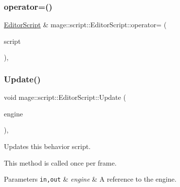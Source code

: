 \mbox{\label{classmage_1_1script_1_1_editor_script_a87df2b20fee97f6aa9e09b4b5c9282a5}} 
\subsubsection{\texorpdfstring{operator=()}{operator=()}\hspace{0.1cm}{\footnotesize\ttfamily [2/2]}}
{\footnotesize\ttfamily \mbox{\hyperlink{classmage_1_1script_1_1_editor_script}{Editor\+Script}} \& mage\+::script\+::\+Editor\+Script\+::operator= (\begin{DoxyParamCaption}\item[{\mbox{\hyperlink{classmage_1_1script_1_1_editor_script}{Editor\+Script}} \&\&}]{script }\end{DoxyParamCaption})\hspace{0.3cm}{\ttfamily [default]}, {\ttfamily [noexcept]}}

\mbox{\label{classmage_1_1script_1_1_editor_script_a311532d499edfaf3f74aa598fb87ec8e}} 
\subsubsection{\texorpdfstring{Update()}{Update()}}
{\footnotesize\ttfamily void mage\+::script\+::\+Editor\+Script\+::\+Update (\begin{DoxyParamCaption}\item[{\mbox{[}\mbox{[}maybe\+\_\+unused\mbox{]} \mbox{]} \mbox{\hyperlink{classmage_1_1_engine}{Engine}} \&}]{engine }\end{DoxyParamCaption})\hspace{0.3cm}{\ttfamily [override]}, {\ttfamily [virtual]}}

Updates this behavior script.

This method is called once per frame.


\begin{DoxyParams}[1]{Parameters}
\mbox{\tt in,out}  & {\em engine} & A reference to the engine. \\
\hline
\end{DoxyParams}

